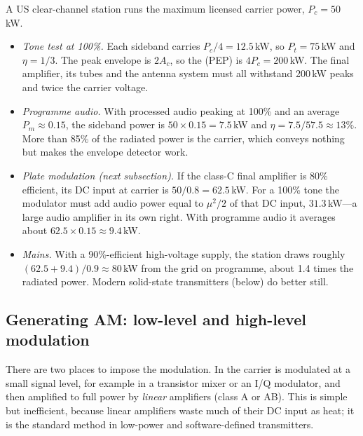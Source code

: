 \begin{worked}
A US clear-channel station runs the maximum licensed carrier power, $P_c=50$\,kW.
\begin{itemize}
\item \emph{Tone test at 100\%.} Each sideband carries $P_c/4=12.5$\,kW, so $P_t=75$\,kW and
$\eta=1/3$. The peak envelope is $2A_c$, so the  (PEP) is $4P_c=200$\,kW. The
final amplifier, its tubes and the antenna system must all withstand 200\,kW peaks and twice the
carrier voltage.
\item \emph{Programme audio.} With processed audio peaking at 100\% and an average $P_m\approx0.15$, the
sideband power is $50\times0.15=7.5$\,kW and $\eta=7.5/57.5\approx13\%$. More than 85\% of the radiated
power is the carrier, which conveys nothing but makes the envelope detector work.
\item \emph{Plate modulation (next subsection).} If the class-C final amplifier is 80\% efficient, its DC
input at carrier is $50/0.8=62.5$\,kW. For a 100\% tone the modulator must add audio power equal to
$\mu^2/2$ of that DC input, $31.3$\,kW---a large audio amplifier in its own right. With programme audio it
averages about $62.5\times0.15\approx9.4$\,kW.
\item \emph{Mains.} With a 90\%-efficient high-voltage supply, the station draws roughly
$(62.5+9.4)/0.9\approx80$\,kW from the grid on programme, about 1.4 times the radiated power. Modern
solid-state transmitters (below) do better still.
\end{itemize}
\end{worked}

\subsection{Generating AM: low-level and high-level modulation}
\label{sec:ch04:amtx}

There are two places to impose the modulation. In  the carrier is modulated
at a small signal level, for example in a transistor mixer or an I/Q modulator, and then amplified to
full power by \emph{linear} amplifiers (class A or AB). This is simple but inefficient, because linear
amplifiers waste much of their DC input as heat; it is the standard method in low-power and
software-defined transmitters.

